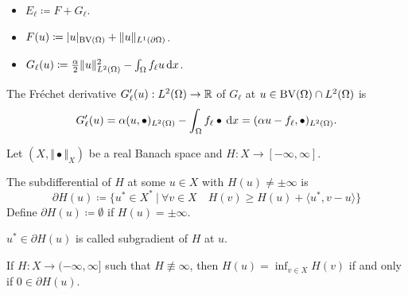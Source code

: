 \documentclass[xcolor=svgnames,english]{beamer}
\begin{document}
\begin{frame}
  \begin{itemize}
    \item $E_\ell\coloneqq F+G_\ell$.
    \item $F(u) \coloneqq |u|_{\textup{BV}(\Omega)} + \Vert u
      \Vert_{L^1(\partial\Omega)}$.
    \item $G_\ell(u)\coloneqq \frac{\alpha}{2}\Vert u\Vert_{L^2(\Omega)}^2 -
    \int_\Omega f_\ell u\,\mathrm{d}x$.
  \end{itemize}
  \pause
  The Fr\'echet derivative $G_\ell'(u):L^2(\Omega)\to\mathbb{R}$ of $G_\ell$ at $u\in
  \textup{BV}(\Omega)\cap L^2(\Omega)$ is
  \begin{align*}
    G_\ell'(u) = \alpha (u,\bullet)_{L^2(\Omega)} - \int_\Omega f_\ell
    \bullet\,\mathrm{d}x = (\alpha u-f_\ell ,\bullet)_{L^2(\Omega)}.
  \end{align*}
\end{frame}

\begin{frame}
  
  \pause
  \bigskip

  Let $(X,\Vert\bullet\Vert_X)$ be a real Banach space and 
  $H:X\to [-\infty,\infty]$.
  \medskip
  \pause

  The subdifferential of $H$ at some $u\in X$ with $H(u)\neq\pm\infty$ is
  \begin{equation*}
    \partial H(u)\coloneq 
    \{u^\ast\in X^\ast\ |\ 
    \forall v\in X\quad H(v)\geq H(u)+\langle u^\ast,v-u\rangle\}  
  \end{equation*}
  Define 
  $\partial H(u)\coloneq\emptyset$
  if $H(u)=\pm\infty$.

  \pause
  \medskip
  $u^\ast\in\partial H(u)$ is called subgradient of $H$ at $u$.

  \pause
  \begin{block}{}
    If $H: X\to (-\infty,\infty]$ such that $H\nequiv\infty$, then
    $H(u)=\inf_{v\in X}H(v)$ if and only if $0\in\partial H(u)$.
  \end{block}
\end{frame}
\end{document}
